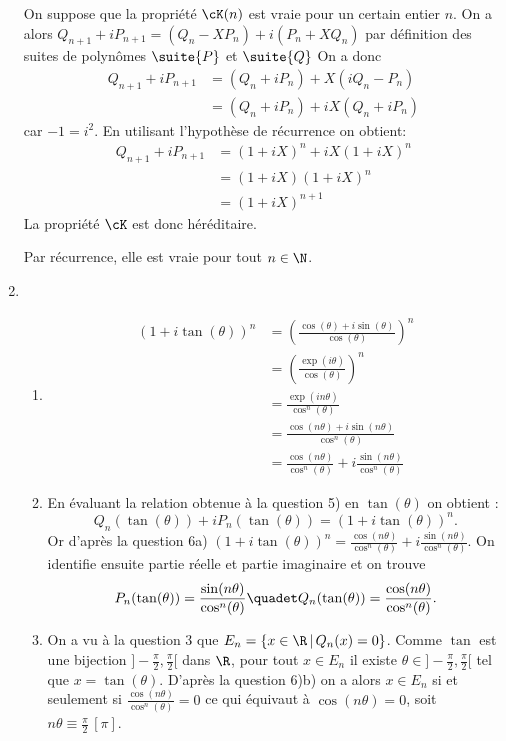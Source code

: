 \begin{correction}
\begin{enumerate}
On suppose que la propriété $\cK(n)$ est vraie pour un certain entier $n$. On a alors 
$Q_{n+1} +iP_{n+1} = (Q_n -X P_n) +i (P_n +XQ_n)$ par définition des suites de polynômes $\suite{P}$ et $\suite{Q}$ 
On  a donc 
\begin{align*}
Q_{n+1} +iP_{n+1} &= (Q_n +iP_n)+X(iQ_n-P_n)\\
							&= (Q_n +iP_n)+iX(Q_n+iP_n)
\end{align*}
car $-1 = i^2$. En utilisant l'hypothèse de récurrence on obtient:
\begin{align*}
Q_{n+1} +iP_{n+1} &= (1+iX)^n+iX (1+iX)^n\\
								&=(1+iX) (1+iX)^n\\
								&=(1+iX)^{n+1} 
\end{align*}
La propriété $\cK$ est donc héréditaire. 

Par récurrence, elle est vraie pour tout $n\in \N$. 

\item \begin{enumerate}
\item 
\begin{align*}
(1+i\tan(\theta))^n &= \left( \frac{\cos(\theta) + i\sin(\theta)}{\cos(\theta)}\right)^n\\
								&=\left( \frac{\exp(i\theta)}{\cos(\theta)}\right)^n\\
								&= \frac{\exp(in\theta)}{\cos^n(\theta)}\\
								&= \frac{\cos(n\theta) +i\sin(n\theta)}{\cos^n(\theta)}\\
								&= \frac{\cos(n\theta) }{\cos^n(\theta)}+i \frac{\sin(n\theta)}{\cos^n(\theta)}
\end{align*}

\item En évaluant la relation obtenue à la question 5) en $\tan(\theta)$ on obtient : 
$$Q_n(\tan(\theta))+iP_n(\tan(\theta))  = (1+i\tan(\theta))^n.$$ Or d'après la question 6a)
$(1+i\tan(\theta))^n= \frac{\cos(n\theta) }{\cos^n(\theta)}+i \frac{\sin(n\theta)}{\cos^n(\theta)}$. On identifie ensuite partie réelle et partie imaginaire et on trouve 
$$P_n(\tan(\theta) )= \frac{\sin(n\theta)}{\cos^n(\theta)} \quadet Q_n(\tan(\theta) )= \frac{\cos(n\theta)}{\cos^n(\theta)}.$$

\item On a vu à la question 3 que $E_n=\{ x\in \R\, |\, Q_n(x) = 0\}$. Comme $\tan $ est une bijection $]-\frac{\pi}{2},\frac{\pi}{2}[$ dans $\R$, pour tout $x\in E_n$ il existe $\theta \in ]-\frac{\pi}{2},\frac{\pi}{2}[$ tel que $x= \tan(\theta)$.  D'après la question 6)b) on  a alors 
  $x\in E_n$ si et seulement si $\frac{\cos(n\theta)}{\cos^n(\theta)}=0$ ce qui équivaut à $\cos(n\theta ) = 0$, soit $n\theta \equiv   \frac{\pi}{2}\,[\pi]$. 
  

\end{enumerate}
\end{enumerate}
\end{correction}
